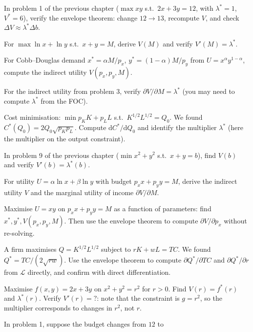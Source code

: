 \begin{problems}
  \item In problem 1 of the previous chapter ($\max x y$ s.t.\
        $2 x + 3 y = 12$, with $\lambda^* = 1$, $V^* = 6$), verify the
        envelope theorem: change $12 \to 13$, recompute $V$, and check
        $\Delta V \approx \lambda^* \Delta b$.
  \item For $\max \ln x + \ln y$ s.t.\ $x + y = M$, derive $V(M)$ and
        verify $V'(M) = \lambda^*$.
  \item For Cobb--Douglas demand $x^* = \alpha M/p_x$,
        $y^* = (1 - \alpha) M/p_y$ from $U = x^\alpha y^{1 - \alpha}$,
        compute the indirect utility $V(p_x, p_y, M)$.
  \item For the indirect utility from problem 3, verify
        $\partial V/\partial M = \lambda^*$ (you may need to compute
        $\lambda^*$ from the FOC).
  \item Cost minimisation: $\min p_K K + p_L L$ s.t.\
        $K^{1/2} L^{1/2} = Q_0$. We found
        $C^*(Q_0) = 2 Q_0 \sqrt{p_K p_L}$. Compute
        $\mathrm{d}C^*/\mathrm{d}Q_0$ and identify the multiplier
        $\lambda^*$ (here the multiplier on the output constraint).
  \item In problem 9 of the previous chapter ($\min x^2 + y^2$ s.t.\
        $x + y = b$), find $V(b)$ and verify $V'(b) = \lambda^*(b)$.
  \item For utility $U = \alpha \ln x + \beta \ln y$ with budget
        $p_x x + p_y y = M$, derive the indirect utility $V$ and the
        marginal utility of income $\partial V/\partial M$.
  \item Maximise $U = x y$ on $p_x x + p_y y = M$ as a function of
        parameters: find $x^*, y^*, V(p_x, p_y, M)$. Then use the envelope
        theorem to compute $\partial V/\partial p_x$ without re-solving.
  \item A firm maximises $Q = K^{1/2} L^{1/2}$ subject to
        $r K + w L = TC$. We found $Q^* = TC/(2 \sqrt{r w})$. Use the
        envelope theorem to compute $\partial Q^*/\partial TC$ and
        $\partial Q^*/\partial r$ from $\mathcal{L}$ directly, and confirm
        with direct differentiation.
  \item Maximise $f(x, y) = 2 x + 3 y$ on $x^2 + y^2 = r^2$ for $r > 0$.
        Find $V(r) = f^*(r)$ and $\lambda^*(r)$. Verify $V'(r) = ?$:
        note that the constraint is $g = r^2$, so the multiplier corresponds
        to changes in $r^2$, not $r$.
  \item In problem 1, suppose the budget changes from $12$ to

\end{problems}
